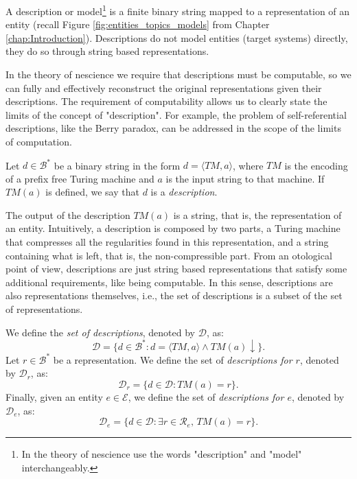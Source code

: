 A description or model\footnote{In the theory of nescience use the words "description" and "model" interchangeably.} is a finite binary string mapped to a representation of an entity (recall Figure \ref{fig:entities_topics_models} from Chapter \ref{chap:Introduction}). Descriptions do not model entities (target systems) directly, they do so through string based representations.

In the theory of nescience we require that descriptions must be computable, so we can fully and effectively reconstruct the original representations given their descriptions. The requirement of computability allows us to clearly state the limits of the concept of "description". For example, the problem of self-referential descriptions, like the Berry paradox, can be addressed in the scope of the limits of computation.

\begin{definition} [Model]
\label{def:descriptions_model}
Let $d \in \mathcal{B}^\ast$ be a binary string in the form $d = \langle TM,a \rangle$, where $TM$ is the encoding of a prefix free Turing machine and $a$ is the input string to that machine. If $TM(a)$ is defined, we say that $d$ is a \emph{description}. 
\end{definition}

The output of the description $TM(a)$ is a string, that is, the representation of an entity. Intuitively, a description is composed by two parts, a Turing machine that compresses all the regularities found in this representation, and a string containing what is left, that is, the non-compressible part. From an otological point of view, descriptions are just string based representations that satisfy some additional requirements, like being computable. In this sense, descriptions are also representations themselves, i.e., the set of descriptions is a subset of the set of representations.

\begin{definition}
\label{def:descriptions_model}
We define the \emph{set of descriptions}, denoted by $\mathcal{D}$, as:
\[
\mathcal{D} = \{ d \in \mathcal{B}^\ast : d = \langle TM,a \rangle \wedge TM(a) \downarrow \}.
\]
Let $r \in \mathcal{B}^\ast$ be a representation. We define the set of \emph{descriptions for $r$}, denoted by $\mathcal{D}_r$, as:
\[
\mathcal{D}_r = \{ d \in \mathcal{D} : TM(a) = r \}.
\]
Finally, given an entity $e \in \mathcal{E}$, we define the set of \emph{descriptions for $e$}, denoted by $\mathcal{D}_e$, as:
\[
\mathcal{D}_e = \{ d \in \mathcal{D} : \exists r \in \mathcal{R}_e,\, TM(a) = r \}.
\]
\end{definition}

